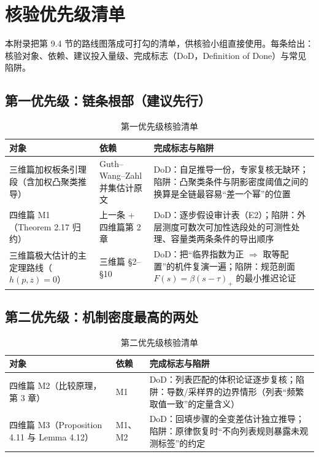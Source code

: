 \section{核验优先级清单}

本附录把第 9.4 节的路线图落成可打勾的清单，供核验小组直接使用。每条给出：核验对象、依赖、建议投入量级、完成标志（DoD，Definition of Done）与常见陷阱。

\subsection{第一优先级：链条根部（建议先行）}

\begin{table}[ht]
\centering
\caption{第一优先级核验清单}
\label{tab:check1}
\footnotesize
\begin{tabularx}{\textwidth}{@{}L{2.4cm}L{2.4cm}Y@{}}
\toprule
{}\textbf{对象} & \textbf{依赖} & \textbf{完成标志与陷阱} \\
\midrule
三维篇加权板条引理段（含加权凸聚类推导） & Guth--Wang--Zahl 并集估计原文 & DoD：自足推导一份，专家复核无缺环；陷阱：凸聚类条件与阴影密度阈值之间的换算是全链最容易“差一个幂”的位置 \\
四维篇 M1（Theorem 2.17 归约） & 上一条 + 四维篇第 2 章 & DoD：逐步假设审计表（E2）；陷阱：外层测度可数次可加性选段处的可测性处理、容量类两条条件的导出顺序 \\
三维篇极大估计的主定理路线（$h(p,z)=0$） & 三维篇 §2--§10 & DoD：把“临界指数为正 $\Rightarrow$ 取等配置”的机件复演一遍；陷阱：规范剖面 $F(s)=\beta(s-\tau)_{+}$ 的最小推迟论证 \\
\bottomrule
\end{tabularx}
\end{table}

\subsection{第二优先级：机制密度最高的两处}

\begin{table}[ht]
\centering
\caption{第二优先级核验清单}
\label{tab:check2}
\footnotesize
\begin{tabularx}{\textwidth}{@{}L{2.4cm}L{2.4cm}Y@{}}
\toprule
{}\textbf{对象} & \textbf{依赖} & \textbf{完成标志与陷阱} \\
\midrule
四维篇 M2（比较原理，第 3 章） & M1 & DoD：列表匹配的体积论证逐步复核；陷阱：导数/采样界的边界情形（列表“频繁取值一致”的定量含义） \\
四维篇 M3（Proposition 4.11 与 Lemma 4.12） & M1、M2 & DoD：回填步骤的全变差估计独立推导；陷阱：原律恢复时“不向列表规则暴露未观测标签”的约定 \\
\bottomrule
\end{tabularx}
\end{table}

